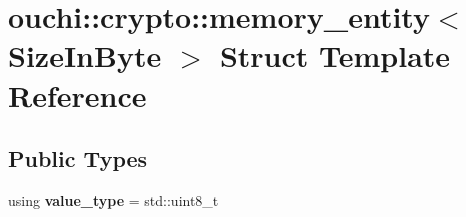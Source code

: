 \hypertarget{structouchi_1_1crypto_1_1memory__entity}{}\section{ouchi\+::crypto\+::memory\+\_\+entity$<$ Size\+In\+Byte $>$ Struct Template Reference}
\label{structouchi_1_1crypto_1_1memory__entity}
\subsection*{Public Types}
\begin{DoxyCompactItemize}
\item 
\mbox{\label{structouchi_1_1crypto_1_1memory__entity_a4b7efb6818bc884a1d2381a02d85cfff}} 
using {\bfseries value\+\_\+type} = std\+::uint8\+\_\+t
\end{DoxyCompactItemize}

